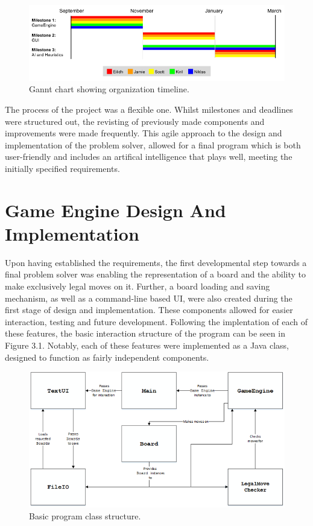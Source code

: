 \documentclass{l3proj}
\begin{document}
\begin{figure}[H]
\centering
\includegraphics[scale=0.5]{Images/GanntChart.png}
\caption{Gannt chart showing organization timeline.}
\end{figure}

The process of the project was a flexible one. Whilst milestones and deadlines were structured out, the revisting of previously made components and improvements were made frequently. This agile approach to the design and implementation of the problem solver, allowed for a final program which is both user-friendly and includes an artifical intelligence that plays well, meeting the initially specified requirements.

\section{Game Engine Design And Implementation}

Upon having established the requirements, the first developmental step towards a final problem solver was enabling the representation of a board and the ability to make exclusively legal moves on it. Further, a board loading and saving mechanism, as well as a command-line based UI, were also created during the first stage of design and implementation. These components allowed for easier interaction, testing and future development. Following the implentation of each of these features, the basic interaction structure of the program can be seen in Figure 3.1. Notably, each of these features were implemented as a Java class, designed to function as fairly independent components.

\begin{figure}[H]
\centering
\includegraphics[scale=1]{Images/S33Diagram.png}
\caption{Basic program class structure.}
\end{figure}
\end{document}
